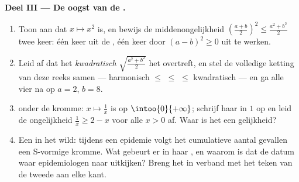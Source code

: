 \begin{problem}
\medskip
\noindent\textbf{Deel III --- De oogst van de .}
\begin{enumerate}[resume]
  \item Toon aan dat $x \mapsto x^2$  is, en bewijs de
        middenongelijkheid
        $\left(\frac{a + b}{2}\right)^2 \leq \frac{a^2 + b^2}{2}$ twee keer:
        één keer uit de , één keer door $(a - b)^2 \geq 0$ uit te
        werken.
  \item Leid af dat het \emph{kwadratisch }
        $\sqrt{\frac{a^2 + b^2}{2}}$ het   overtreft, en
        stel de volledige ketting van deze reeks samen --- harmonisch $\leq$
         $\leq$  $\leq$ kwadratisch --- en ga alle vier
        na op $a = 2$, $b = 8$.
  \item {} onder de kromme: $x \mapsto \frac1x$ is  op
        $\intoo{0}{+\infty}$; schrijf haar  in $1$ op en leid de
        ongelijkheid $\frac1x \geq 2 - x$ voor alle $x > 0$ af. Waar is het
        een gelijkheid?
  \item Een  in het wild: tijdens een epidemie volgt het cumulatieve
        aantal gevallen een S-vormige kromme. Wat gebeurt er in haar ,
        en waarom is dat de datum waar epidemiologen naar uitkijken? Breng het
        in verband met het teken van de tweede  aan elke kant.
\end{enumerate}


\end{problem}
